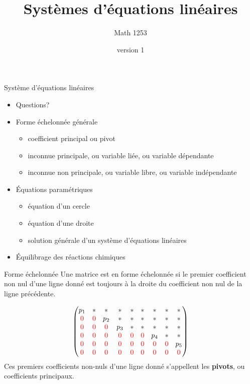 \documentclass[french]{beamer}
\title{Systèmes d'équations linéaires}
\author{Math 1253} %
\date{version 1}   %
\begin{document}
	\frame{\titlepage}
	
	\begin{frame}{Système d'équations linéaires}
	\begin{itemize}
	\item Questions?
	\item Forme échelonnée générale
	\begin{itemize}
		\item coefficient principal ou pivot
		\item inconnue principale, ou variable liée, ou variable dépendante
		\item inconnue non principale, ou variable libre, ou variable indépendante
	\end{itemize}
	\item Équations paramétriques
	\begin{itemize}
	\item équation d'un cercle
	\item équation d'une droite
	\item solution générale d'un système d'équations linéaires
	\end{itemize}
	\item Équilibrage des réactions chimiques
	\end{itemize}
\end{frame}	

\begin{frame}{Forme échelonnée}
Une matrice est en forme échelonnée si
le premier coefficient non nul d'une ligne donné est toujours à 	la droite du coefficient non nul de la ligne précédente.

\[
\begin{pmatrix}
p_1 & *  & * & * & * & * & * & * & * \\
{\color{red}{0}} & {\color{red}{0}} & p_2 & * & * & * & * & * & * \\
{\color{red}{0}} & {\color{red}{0}} & {\color{red}{0}} & p_3 & * & * & * & * & * \\ 
{\color{red}{0}} & {\color{red}{0}} & {\color{red}{0}} & {\color{red}{0}} & {\color{red}{0}} & {\color{red}{0}} & p_4 & * & * \\ 
{\color{red}{0}} & {\color{red}{0}} & {\color{red}{0}} & {\color{red}{0}} & {\color{red}{0}} & {\color{red}{0}} & {\color{red}{0}} & {\color{red}{0}} & p_5 \\ 
{\color{red}{0}} & {\color{red}{0}} & {\color{red}{0}} & {\color{red}{0}} & {\color{red}{0}} & {\color{red}{0}} & {\color{red}{0}} & {\color{red}{0}} & {\color{red}{0}} 
\end{pmatrix}
\]
Ces premiers coefficients non-nuls d'une ligne donné s'appellent les \textbf{pivots}, ou 
coefficients principaux.
\end{frame}
\end{document}
